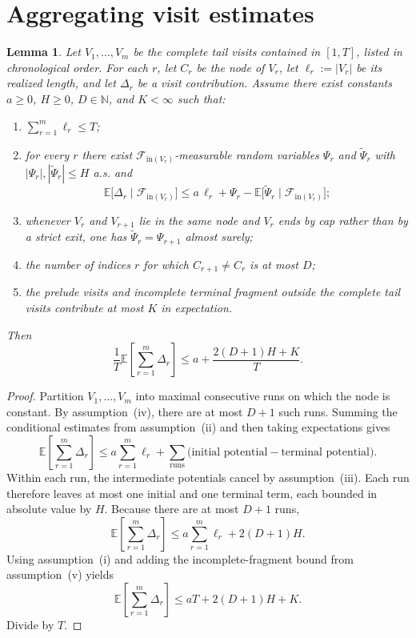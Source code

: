 \documentclass[12pt]{article}
\newtheorem{lemma}[theorem]{Lemma}
\theoremstyle{definition}
\newcommand{\N}{\mathbb{N}}
\newcommand{\E}{\mathbb{E}}
\newcommand{\1}{\mathbf{1}}
\newcommand{\cF}{\mathcal{F}}
\begin{document}
\section{Aggregating visit estimates}
\label{app:aggregation}

\begin{lemma}
\label{lem:aggregation}
Let $V_1,\dots,V_m$ be the complete tail visits contained in $[1,T]$, listed in
chronological order. For each $r$, let $C_r$ be the node of $V_r$,
let $\ell_r:=|V_r|$ be its realized length, and let $\Delta_r$ be a visit
contribution.
Assume there exist constants $a\ge 0$, $H\ge 0$, $D\in\N$, and $K<\infty$ such
that:
\begin{enumerate}[label=\textnormal{(\roman*)},leftmargin=2.6em]
\item $\sum_{r=1}^m \ell_r\le T$;
\item for every $r$ there exist $\cF_{\mathrm{in}(V_r)}$-measurable random
variables $\Psi_r$ and $\widetilde\Psi_r$ with
$|\Psi_r|,|\widetilde\Psi_r|\le H$ a.s. and
\[
\E\bigl[\Delta_r\mid \cF_{\mathrm{in}(V_r)}\bigr]
\le
a\,\ell_r
+
\Psi_r-\E\bigl[\widetilde\Psi_r\mid \cF_{\mathrm{in}(V_r)}\bigr];
\]
\item whenever $V_r$ and $V_{r+1}$ lie in the same node and $V_r$ ends by cap
rather than by a strict exit, one has
$\widetilde\Psi_r=\Psi_{r+1}$ almost surely;
\item the number of indices $r$ for which $C_{r+1}\neq C_r$ is at most $D$;
\item the prelude visits and incomplete terminal fragment outside the complete
tail visits contribute at most $K$ in expectation.
\end{enumerate}
Then
\[
\frac1T\E\left[\sum_{r=1}^m \Delta_r\right]
\le a + \frac{2(D+1)H+K}{T}.
\]
\end{lemma}

\begin{proof}
Partition $V_1,\dots,V_m$ into maximal consecutive runs on which the node is
constant. By assumption~(iv), there are at most $D+1$ such runs. Summing the
conditional estimates from assumption~(ii) and then taking expectations gives
\[
\E\left[\sum_{r=1}^m \Delta_r\right]
\le
a\sum_{r=1}^m \ell_r
+
\sum_{\text{runs}}
\bigl(\text{initial potential} - \text{terminal potential}\bigr).
\]
Within each run, the intermediate potentials cancel by assumption~(iii). Each
run therefore leaves at most one initial and one terminal term, each bounded in
absolute value by $H$. Because there are at most $D+1$ runs,
\[
\E\left[\sum_{r=1}^m \Delta_r\right]
\le
a\sum_{r=1}^m \ell_r + 2(D+1)H.
\]
Using assumption~(i) and adding the incomplete-fragment bound from
assumption~(v) yields
\[
\E\left[\sum_{r=1}^m \Delta_r\right]
\le
aT + 2(D+1)H + K.
\]
Divide by $T$.
\end{proof}
\end{document}
